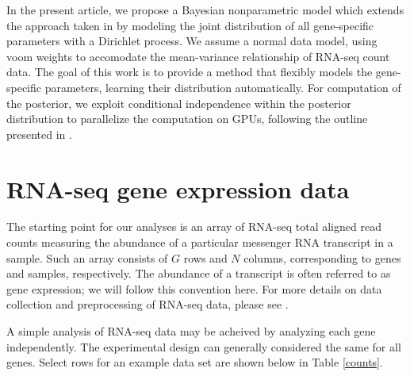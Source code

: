 In the present article, we propose a Bayesian nonparametric model which extends the approach taken in \citet{liu} by modeling the joint distribution of all gene-specific parameters with a Dirichlet process. We assume a normal data model, using voom weights to accomodate the mean-variance relationship of RNA-seq count data. The goal of this work is to provide a method that flexibly models the gene-specific parameters, learning their distribution automatically. For computation of the posterior, we exploit conditional independence within the posterior distribution to parallelize the computation on GPUs, following the outline presented in \citet{suchard}.


\section{RNA-seq gene expression data}
\label{sec:data}
The starting point for our analyses is an array of RNA-seq total aligned read counts measuring the abundance of a particular messenger RNA transcript in a sample. Such an array consists of $G$ rows and $N$ columns, corresponding to genes and samples, respectively. The abundance of a transcript is often referred to as gene expression; we will follow this convention here. For more details on data collection and preprocessing of RNA-seq data, please see \citet{datta2014}.

A simple analysis of RNA-seq data may be acheived by analyzing each gene independently. The experimental design can generally considered the same for all genes. Select rows for an example data set are shown below in Table \ref{counts}.

